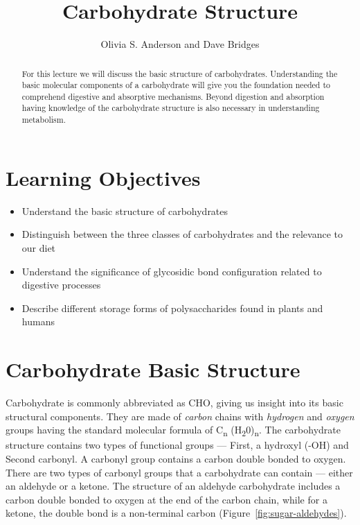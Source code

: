 \documentclass{tufte-handout}
\title{Carbohydrate Structure}
\author{Olivia S. Anderson and Dave Bridges}
\begin{document}
\maketitle%

\begin{abstract}
For this lecture we will discuss the basic structure of carbohydrates. Understanding the basic molecular components of a carbohydrate will give you the foundation needed to comprehend digestive and absorptive mechanisms. Beyond digestion and absorption having knowledge of the carbohydrate structure is also necessary in understanding metabolism. 
\end{abstract}

\tableofcontents


\pagebreak{}

\section{Learning Objectives}

\begin{itemize}
\item Understand the basic structure of carbohydrates
\item Distinguish between the three classes of carbohydrates and the relevance to our diet
\item Understand the significance of glycosidic bond configuration related to digestive processes
\item Describe different storage forms of polysaccharides found in plants and humans
\end{itemize}

\section{Carbohydrate Basic Structure}\label{carbohydrate-basic-structure}
Carbohydrate is commonly abbreviated as CHO, giving us insight into its basic structural components. They are made of \emph{carbon} chains with \emph{hydrogen} and \emph{oxygen} groups having the standard molecular formula of C\textsubscript{n} (H\textsubscript{2}0)\textsubscript{n}. The carbohydrate structure contains two types of functional groups --- First, a hydroxyl (-OH) and Second carbonyl. A carbonyl group contains a carbon double bonded to oxygen. There are two types of carbonyl groups that a carbohydrate can contain --- either an aldehyde or a ketone. The structure of an aldehyde carbohydrate includes a carbon double bonded to oxygen at the end of the carbon chain, while for a ketone, the double bond is a non-terminal carbon (Figure~\ref{fig:sugar-aldehydes}).
\end{document}
